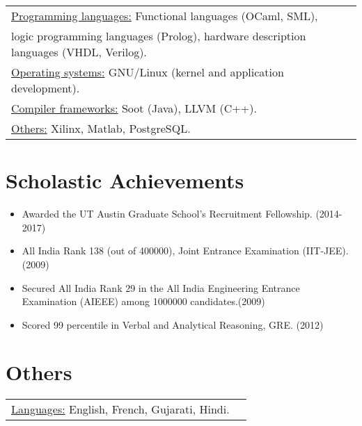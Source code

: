 \documentclass[margin]{res}
\begin{document}
\begin{resume}
\begin{tabular}{l p{3in}}
    \underline{Programming languages:} Functional languages (OCaml,
    SML), \\ logic programming languages (Prolog),
    hardware description languages (VHDL, Verilog). \\

    \underline{Operating systems:} GNU/Linux (kernel and application development). \\

    \underline{Compiler frameworks:} Soot (Java), LLVM (C++). \\

    \underline{Others:} Xilinx, Matlab, PostgreSQL. \\
 \end{tabular}

\section{Scholastic Achievements}
 \begin{itemize} \itemsep -2pt  %
 \item Awarded the UT Austin Graduate School's Recruitment
   Fellowship. \hfill (2014-2017)
 \item All India Rank 138 (out of 400000), Joint Entrance Examination
   (IIT-JEE). \hfill (2009)
 \item Secured All India Rank 29 in the All India Engineering Entrance
   Examination (AIEEE) among 1000000 candidates.\hfill (2009)
 \item Scored 99 percentile in Verbal and Analytical Reasoning,
   GRE. \hfill (2012)
 \end{itemize}

\section{Others}
\begin{tabular}{l p{3in}}
  \underline{Languages:} English, French, Gujarati, Hindi. \\
\end{tabular}

\end{resume}
\end{document}
